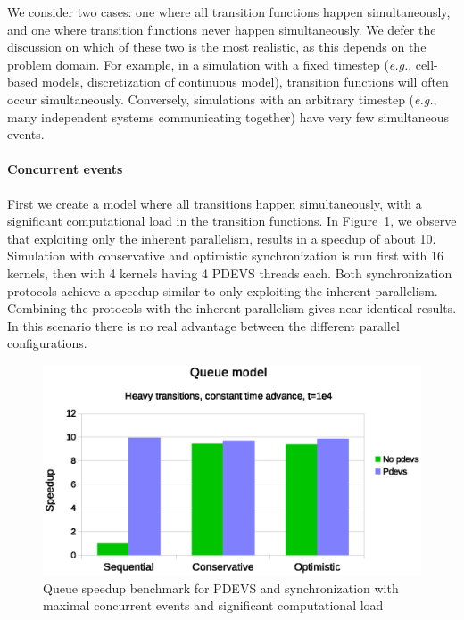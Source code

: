 We consider two cases: one where all transition functions happen simultaneously, and one where transition functions never happen simultaneously.
We defer the discussion on which of these two is the most realistic, as this depends on the problem domain.
For example, in a simulation with a fixed timestep (\textit{e.g.}, cell-based models, discretization of continuous model), transition functions will often occur simultaneously.
Conversely, simulations with an arbitrary timestep (\textit{e.g.}, many independent systems communicating together) have very few simultaneous events.

\paragraph{Concurrent events}
First we create a model where all transitions happen simultaneously, with a significant computational load in the transition functions.
In Figure~\ref{fig:pdevs_plot_fixed_sleep}, we observe that exploiting only the inherent parallelism, results in a speedup of about 10.  
Simulation with conservative and optimistic synchronization is run first with 16 kernels, then with 4 kernels having 4 PDEVS threads each. 
Both synchronization protocols achieve a speedup similar to only exploiting the inherent parallelism.
Combining the protocols with the inherent parallelism gives near identical results.
In this scenario there is no real advantage between the different parallel configurations.

\begin{figure}
	\center
	\includegraphics[width=\columnwidth]{fig/pdevs_fixed_sleep.eps}
	\caption{Queue speedup benchmark for PDEVS and synchronization with maximal concurrent events and significant computational load}
	\label{fig:pdevs_plot_fixed_sleep}
\end{figure}

